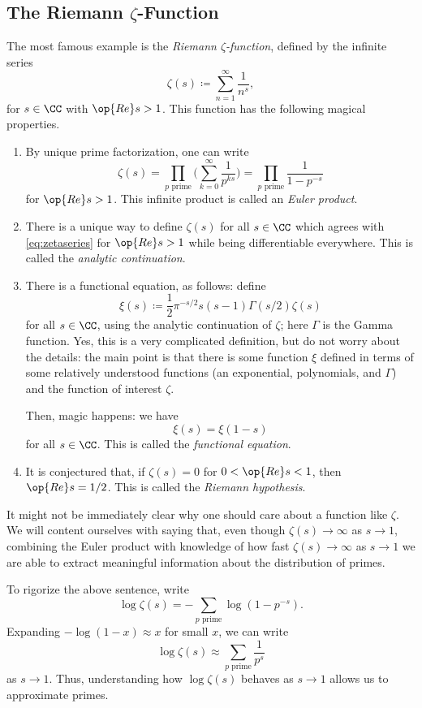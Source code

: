 \documentclass{article}
\begin{document}
\subsection{The Riemann \texorpdfstring{$\zeta$}{ Z}-Function}
The most famous example is the \textit{Riemann $\zeta$-function}, defined by the infinite series
\begin{equation}
	\zeta(s)\coloneqq\sum_{n=1}^\infty\frac1{n^s}, \label{eq:zetaseries}
\end{equation}
for $s\in\CC$ with $\op{Re}s>1$. This function has the following magical properties.
\begin{enumerate}
	\item By unique prime factorization, one can write
	\[\zeta(s)=\prod_{p\text{ prime}}\Bigg(\sum_{k=0}^\infty\frac1{p^{ks}}\Bigg)=\prod_{p\text{ prime}}\frac1{1-p^{-s}}\]
	for $\op{Re}s>1$. This infinite product is called an \textit{Euler product}.
	\item There is a unique way to define $\zeta(s)$ for all $s\in\CC$ which agrees with \autoref{eq:zetaseries} for $\op{Re}s>1$ while being differentiable everywhere. This is called the \textit{analytic continuation}.
	\item There is a functional equation, as follows: define
	\[\xi(s)\coloneqq\frac12\pi^{-s/2}s(s-1)\Gamma(s/2)\zeta(s)\]
	for all $s\in\CC$, using the analytic continuation of $\zeta$; here $\Gamma$ is the Gamma function. Yes, this is a very complicated definition, but do not worry about the details: the main point is that there is some function $\xi$ defined in terms of some relatively understood functions (an exponential, polynomials, and $\Gamma$) and the function of interest $\zeta$.

	Then, magic happens: we have
	\[\xi(s)=\xi(1-s)\]
	for all $s\in\CC$. This is called the \textit{functional equation}.
	\item It is conjectured that, if $\zeta(s)=0$ for $0<\op{Re}s<1$, then $\op{Re}s=1/2$. This is called the \textit{Riemann hypothesis}.
\end{enumerate}
It might not be immediately clear why one should care about a function like $\zeta$. We will content ourselves with saying that, even though $\zeta(s)\to\infty$ as $s\to1$, combining the Euler product with knowledge of how fast $\zeta(s)\to\infty$ as $s\to1$ we are able to extract meaningful information about the distribution of primes.
\begin{remark} \label{rem:whyzeta}
	To rigorize the above sentence, write
	\[\log\zeta(s)=-\sum_{p\text{ prime}}\log\left(1-p^{-s}\right).\]
	Expanding $-\log(1-x)\approx x$ for small $x$, we can write
	\[\log\zeta(s)\approx\sum_{p\text{ prime}}\frac1{p^s}\]
	as $s\to1$. Thus, understanding how $\log\zeta(s)$ behaves as $s\to1$ allows us to approximate primes.
\end{remark}
\end{document}
